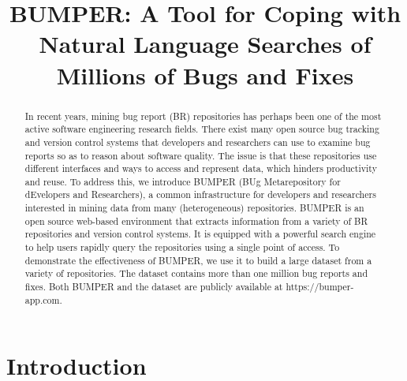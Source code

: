 \documentclass[conference]{IEEEtran}
\begin{document}
\title{BUMPER: A Tool for Coping with Natural Language Searches of Millions of Bugs and Fixes}


\author{
\and
{}

}

\maketitle


\begin{abstract}
In recent years, mining bug report (BR) repositories has perhaps been one of the most active software engineering research fields.
There exist many open source bug tracking and version control systems that
developers and researchers can use to examine bug reports so as to reason
about software quality.
The issue is that these repositories use different interfaces and ways to
access and represent data, which hinders productivity and reuse.
To address this, we introduce BUMPER (BUg Metarepository for dEvelopers
and Researchers), a common infrastructure for developers and researchers
interested in mining data from many (heterogeneous) repositories.
BUMPER is an open source web-based environment that extracts information
from a variety of BR repositories and version control systems.
It is equipped with a powerful search engine to help users rapidly query
the repositories using a single point of access.
To demonstrate the effectiveness of BUMPER, we use it to build a large
dataset from a variety of repositories. The dataset contains more than
one million bug reports and fixes. Both BUMPER and the dataset are publicly
available at https://bumper-app.com.

\end{abstract}


\IEEEpeerreviewmaketitle


\section{Introduction}
\end{document}

